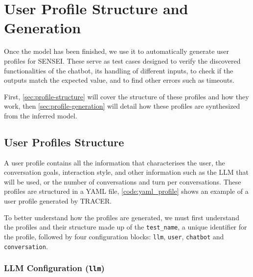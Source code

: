 
\chapter{User Profile Structure and Generation}\label{chapter:user_profiles}

Once the model has been finished,
we use it to automatically generate user profiles for SENSEI.
These serve as test cases designed to verify
the discovered functionalities of the chatbot,
its handling of different inputs,
to check if the outputs match the expected value,
and to find other errors such as timeouts.

First, \autoref{sec:profile-structure}
will cover the structure of these profiles and how they work,
then \autoref{sec:profile-generation}
will detail how these profiles are synthesized from the inferred model.


\section{User Profiles Structure}\label{sec:profile-structure}

A user profile contains all the information
that characterises the user,
the conversation goals,
interaction style,
and other information such as the \ac{LLM} that will be used,
or the number of conversations and turn per conversations.
These profiles are structured in a YAML file,
\autoref{code:yaml_profile} shows an example of a user profile generated by \ac{TRACER}.

\begin{figure}[htpb]
  \centering
  
\end{figure}

To better understand how the profiles are generated,
we must first understand the profiles and their structure
made up of the \texttt{test\_name},
a unique identifier for the profile,
followed by four configuration blocks: 
\texttt{llm}, \texttt{user}, \texttt{chatbot} and \texttt{conversation}.

\subsection{LLM Configuration (\texttt{llm})}

